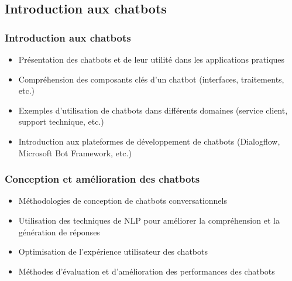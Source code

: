 \documentclass{beamer}
\begin{document}
\subsection{Introduction aux chatbots}
\begin{frame}
	\frametitle{Introduction aux chatbots}
	\begin{itemize}
		\item Présentation des chatbots et de leur utilité dans les applications pratiques
		\item Compréhension des composants clés d'un chatbot (interfaces, traitements, etc.)
		\item Exemples d'utilisation de chatbots dans différents domaines (service client, support technique, etc.)
		\item Introduction aux plateformes de développement de chatbots (Dialogflow, Microsoft Bot Framework, etc.)
	\end{itemize}
\end{frame}

\begin{frame}
	\frametitle{Conception et amélioration des chatbots}
	\begin{itemize}
		\item Méthodologies de conception de chatbots conversationnels
		\item Utilisation des techniques de NLP pour améliorer la compréhension et la génération de réponses
		\item Optimisation de l'expérience utilisateur des chatbots
		\item Méthodes d'évaluation et d'amélioration des performances des chatbots
	\end{itemize}
\end{frame}
\end{document}
